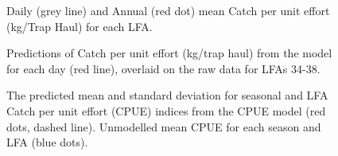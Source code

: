 \documentclass[11pt]{article}
\newcommand{\e}{/SpinDr/backup/bio_data/bio.lobster/figures/LFA3438Framework2019/} %
\begin{document}


\iffalse
    \begin{figure}
    \centering
        \pdftooltip{
        \texttt{[image: \\e Brad/FSRSmodelBayesShorts.png]}}{Figure 106}
        \caption{Annual index of sublegal sized (\textless 82.5 mm) lobsters from the FSRS model with 95\% credible intervals for each LFA.}

    \end{figure}


    \begin{figure}
    \centering
        \pdftooltip{
        \texttt{[image: \\e Brad/FSRSmodelBayesLegals.png]}}{Figure 107}
        \caption{Annual index of legal sized (\textgreater 82.5 mm) lobsters from the FSRS model with 95\% credible intervals for each LFA.}

    \end{figure}


    \begin{figure}
    \centering
        \pdftooltip{
        \texttt{[image: \\e Brad/FSRSmodelBayesRecruits.png]}}{Figure 108}
        \caption{Annual index of recruit sized (75-82.5 mm) lobsters from the FSRS model with 95\% credible intervals for each LFA.}

    \end{figure}

\fi



  \begin{figure}
    \centering
        \caption{Daily (grey line) and Annual (red dot) mean Catch per unit effort (kg/Trap Haul) for each LFA.}

    \end{figure}



    \begin{figure}
    \centering
        \caption{Predictions of Catch per unit effort (kg/trap haul) from the model for each day (red line), overlaid on the raw data for LFAs 34-38. }

    \end{figure}

    \begin{figure}
    \centering
            \caption{The predicted mean and standard deviation for seasonal and LFA Catch per unit effort (CPUE) indices from the CPUE model (red dots, dashed line). Unmodelled mean CPUE for each season and LFA (blue dots).}

  \end{figure}
\end{document}
